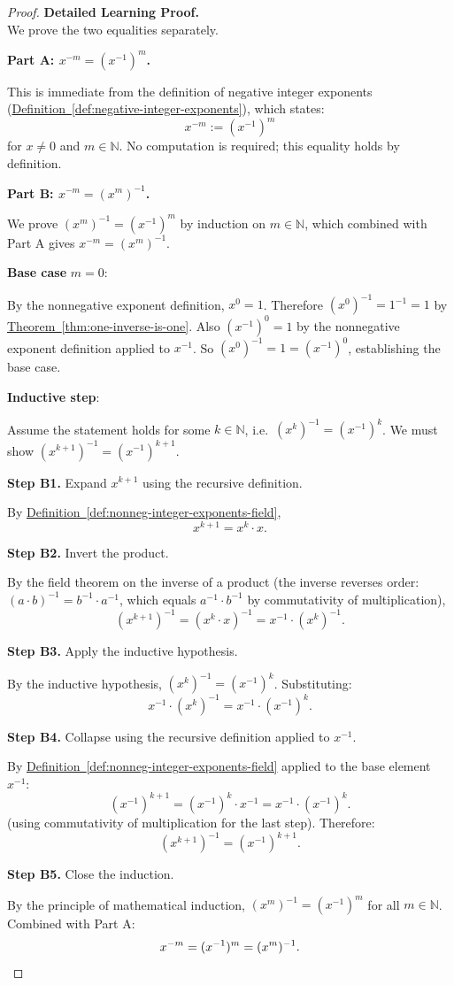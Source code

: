 \begin{proof}
\textbf{Detailed Learning Proof.}~\\

We prove the two equalities separately.

\textbf{Part A: $x^{-m} = (x^{-1})^m$.}

This is immediate from the definition of negative integer exponents
(\hyperref[def:negative-integer-exponents]{Definition~\ref*{def:negative-integer-exponents}}),
which states:
\[
x^{-m} := (x^{-1})^m
\]
for $x\neq 0$ and $m\in\mathbb{N}$.  No computation is required; this equality
holds by definition.

\textbf{Part B: $x^{-m} = (x^m)^{-1}$.}

We prove $(x^m)^{-1} = (x^{-1})^m$ by induction on $m\in\mathbb{N}$, which
combined with Part A gives $x^{-m} = (x^m)^{-1}$.

\textbf{Base case} $m = 0$:

By the nonnegative exponent definition, $x^0 = 1$.  Therefore
$(x^0)^{-1} = 1^{-1} = 1$ by \hyperref[thm:one-inverse-is-one]{Theorem~\ref*{thm:one-inverse-is-one}}.
Also $(x^{-1})^0 = 1$ by the nonnegative exponent definition applied to $x^{-1}$.
So $(x^0)^{-1} = 1 = (x^{-1})^0$, establishing the base case.

\textbf{Inductive step}:

Assume the statement holds for some $k\in\mathbb{N}$, i.e.\ $(x^k)^{-1} = (x^{-1})^k$.
We must show $(x^{k+1})^{-1} = (x^{-1})^{k+1}$.

\textbf{Step B1.} Expand $x^{k+1}$ using the recursive definition.

By \hyperref[def:nonneg-integer-exponents-field]{Definition~\ref*{def:nonneg-integer-exponents-field}},
\[
x^{k+1} = x^k \cdot x.
\]

\textbf{Step B2.} Invert the product.

By the field theorem on the inverse of a product (the inverse reverses order:
$(a\cdot b)^{-1} = b^{-1}\cdot a^{-1}$, which equals $a^{-1}\cdot b^{-1}$
by commutativity of multiplication),
\[
(x^{k+1})^{-1} = (x^k\cdot x)^{-1} = x^{-1}\cdot (x^k)^{-1}.
\]

\textbf{Step B3.} Apply the inductive hypothesis.

By the inductive hypothesis, $(x^k)^{-1} = (x^{-1})^k$.  Substituting:
\[
x^{-1}\cdot(x^k)^{-1} = x^{-1}\cdot(x^{-1})^k.
\]

\textbf{Step B4.} Collapse using the recursive definition applied to $x^{-1}$.

By \hyperref[def:nonneg-integer-exponents-field]{Definition~\ref*{def:nonneg-integer-exponents-field}}
applied to the base element $x^{-1}$:
\[
(x^{-1})^{k+1} = (x^{-1})^k \cdot x^{-1} = x^{-1}\cdot(x^{-1})^k.
\]
(using commutativity of multiplication for the last step).  Therefore:
\[
(x^{k+1})^{-1} = (x^{-1})^{k+1}.
\]

\textbf{Step B5.} Close the induction.

By the principle of mathematical induction, $(x^m)^{-1} = (x^{-1})^m$ for
all $m\in\mathbb{N}$.  Combined with Part A:
\[
x^{-m} = (x^{-1})^m = (x^m)^{-1}. \qedhere
\]
\end{proof}

